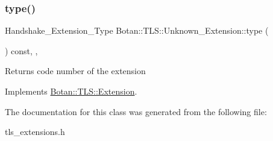 \subsubsection{\texorpdfstring{type()}{type()}}
{\footnotesize\ttfamily Handshake\+\_\+\+Extension\+\_\+\+Type Botan\+::\+T\+L\+S\+::\+Unknown\+\_\+\+Extension\+::type (\begin{DoxyParamCaption}{ }\end{DoxyParamCaption}) const\hspace{0.3cm}{\ttfamily [inline]}, {\ttfamily [override]}, {\ttfamily [virtual]}}

\begin{DoxyReturn}{Returns}
code number of the extension 
\end{DoxyReturn}


Implements \hyperlink{class_botan_1_1_t_l_s_1_1_extension_ac8819b312ce604453225e7b4f7c373ec}{Botan\+::\+T\+L\+S\+::\+Extension}.



The documentation for this class was generated from the following file\+:\begin{DoxyCompactItemize}
\item 
tls\+\_\+extensions.\+h\end{DoxyCompactItemize}
